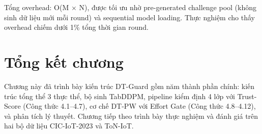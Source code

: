 Tổng overhead: O(M $\times$ N), được tối ưu nhờ pre-generated challenge pool (không sinh dữ liệu mới mỗi round) và sequential model loading. Thực nghiệm cho thấy overhead chiếm dưới 1\% tổng thời gian round.

\section{Tổng kết chương}
Chương này đã trình bày kiến trúc DT-Guard gồm năm thành phần chính: kiến trúc tổng thể 3 thực thể, bộ sinh TabDDPM, pipeline kiểm định 4 lớp với Trust-Score (Công thức 4.1--4.7), cơ chế DT-PW với Effort Gate (Công thức 4.8--4.12), và phân tích lý thuyết. Chương tiếp theo trình bày thực nghiệm và đánh giá trên hai bộ dữ liệu CIC-IoT-2023 và ToN-IoT.
